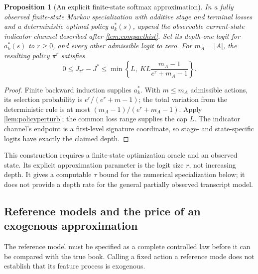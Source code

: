 \documentclass[11pt]{article}
\numberwithin{equation}{section}
\newtheorem{proposition}[theorem]{Proposition}
\theoremstyle{definition}
\theoremstyle{remark}
\theoremstyle{definition}
\begin{document}
\begin{proposition}[An explicit finite-state softmax approximation]
\label{prop:finitesoftmax}
In a fully observed finite-state Markov specialization with additive stage
and terminal losses and a deterministic optimal policy $a_k^*(s)$, append the observable current-state
indicator channel described after \cref{lem:compacthist}. Set its depth-one
logit for $a_k^*(s)$ to $r\ge0$, and every other admissible logit to zero.
For $m_A=|A|$, the resulting policy $\pi^r$ satisfies
\begin{equation}\label{eq:finitesoftmax}
 0\le J_{\pi^r}-J^*
 \le\min\left\{L,\ KL\frac{m_A-1}{e^r+m_A-1}\right\}.
\end{equation}
\end{proposition}
\begin{proof}
Finite backward induction supplies $a_k^*$. With $m\le m_A$ admissible
actions, its selection probability is $e^r/(e^r+m-1)$; the total variation
from the deterministic rule is at most $(m_A-1)/(e^r+m_A-1)$.
Apply \cref{lem:policyperturb}; the common loss range supplies the cap $L$.
The indicator channel's endpoint is a first-level signature coordinate,
so stage- and state-specific logits have exactly the claimed depth.
\end{proof}

This construction requires a finite-state optimization oracle and an
observed state. Its explicit approximation parameter is the logit size $r$,
not increasing depth. It gives a computable $\tau$ bound for the numerical
specialization below; it does not provide a depth rate for the general
partially observed transcript model.

\subsection{Reference models and the price of an exogenous approximation}
\label{sec:endodefect}

The reference model must be specified as a complete controlled law before
it can be compared with the true book. Calling a fixed action a reference
mode does not establish that its feature process is exogenous.
\end{document}
